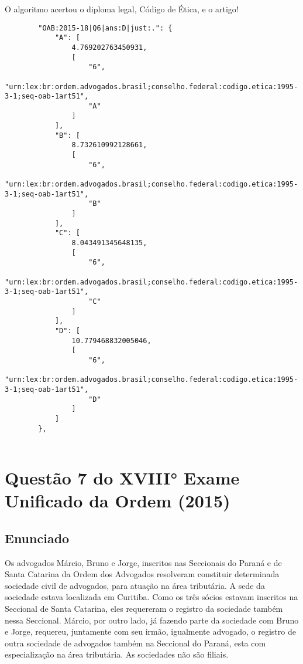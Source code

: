 \documentclass[12pt]{article}
\begin{document}
O algoritmo acertou o diploma legal, Código de Ética, e o artigo!

\begin{lstlisting}
        "OAB:2015-18|Q6|ans:D|just:.": {
            "A": [
                4.769202763450931,
                [
                    "6",
                    "urn:lex:br:ordem.advogados.brasil;conselho.federal:codigo.etica:1995-3-1;seq-oab-1art51",
                    "A"
                ]
            ],
            "B": [
                8.732610992128661,
                [
                    "6",
                    "urn:lex:br:ordem.advogados.brasil;conselho.federal:codigo.etica:1995-3-1;seq-oab-1art51",
                    "B"
                ]
            ],
            "C": [
                8.043491345648135,
                [
                    "6",
                    "urn:lex:br:ordem.advogados.brasil;conselho.federal:codigo.etica:1995-3-1;seq-oab-1art51",
                    "C"
                ]
            ],
            "D": [
                10.779468832005046,
                [
                    "6",
                    "urn:lex:br:ordem.advogados.brasil;conselho.federal:codigo.etica:1995-3-1;seq-oab-1art51",
                    "D"
                ]
            ]
        },
        
\end{lstlisting}


\section{Questão 7 do XVIII° Exame Unificado da Ordem (2015)}

\subsection{Enunciado}

Os advogados Márcio, Bruno e Jorge, inscritos nas Seccionais 
do Paraná e de Santa Catarina da Ordem dos Advogados 
resolveram constituir determinada sociedade civil de 
advogados, para atuação na área tributária. A sede da 
sociedade estava localizada em Curitiba. Como os três sócios 
estavam inscritos na Seccional de Santa Catarina, eles 
requereram o registro da sociedade também nessa Seccional. 
Márcio, por outro lado, já fazendo parte da sociedade com 
Bruno e Jorge, requereu, juntamente com seu irmão, 
igualmente advogado, o registro de outra sociedade de 
advogados também na Seccional do Paraná, esta com 
especialização na área tributária. As sociedades não são filiais. 
 
\end{document}
